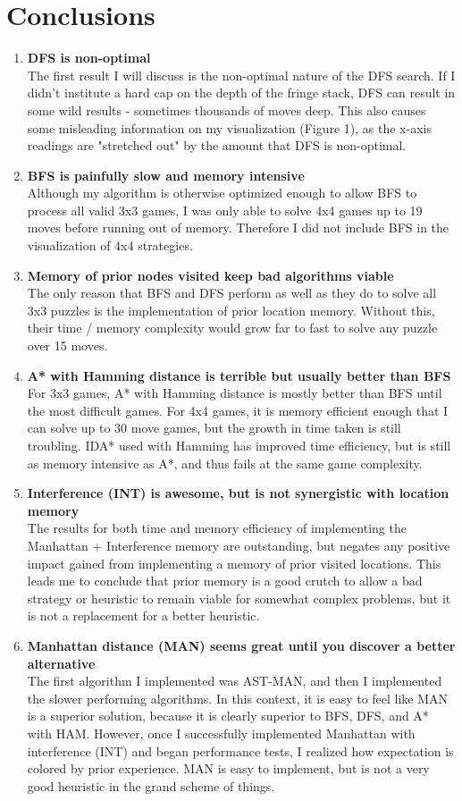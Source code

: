 \documentclass{article}
\newcommand\bitem[1]{\item{\bfseries #1}\\}
\begin{document}
	\section{Conclusions}
	    \begin{enumerate}
	    	\bitem{DFS is non-optimal}
	The first result I will discuss is the non-optimal nature of the DFS search.  If I didn't institute a hard cap on the depth of the fringe stack, DFS can result in some wild results - sometimes thousands of moves deep.  This also causes some misleading information on my visualization (Figure 1), as the x-axis readings are "stretched out" by the amount that DFS is non-optimal.
	        \bitem{BFS is painfully slow and memory intensive}
	Although my algorithm is otherwise optimized enough to allow BFS to process all valid 3x3 games, I was only able to solve 4x4 games up to 19 moves before running out of memory.  Therefore I did not include BFS in the visualization of 4x4 strategies.   
	        \bitem{Memory of prior nodes visited keep bad algorithms viable}
	The only reason that BFS and DFS perform as well as they do to solve all 3x3 puzzles is the implementation of prior location memory.  Without this, their time / memory complexity would grow far to fast to solve any puzzle over 15 moves.
	        \bitem{A* with Hamming distance is terrible but usually better than BFS}
	For 3x3 games, A* with Hamming distance is mostly better than BFS until the most difficult games.  For 4x4 games, it is memory efficient enough that I can solve up to 30 move games, but the growth in time taken is still troubling.  IDA* used with Hamming has improved time efficiency, but is still as memory intensive as A*, and thus fails at the same game complexity.
	        \bitem{Interference (INT) is awesome, but is not synergistic with location memory}
	The results for both time and memory efficiency of implementing the Manhattan + Interference memory are outstanding, but negates any positive impact gained from implementing a memory of prior visited locations.  This leads me to conclude that prior memory is a good crutch to allow a bad strategy or heuristic to remain viable for somewhat complex problems, but it is not a replacement for a better heuristic.
	        \bitem{Manhattan distance (MAN) seems great until you discover a better alternative}
	The first algorithm I implemented was AST-MAN, and then I implemented the slower performing algorithms.  In this context, it is easy to feel like MAN is a superior solution, because it is clearly superior to BFS, DFS, and A* with HAM.  However, once I successfully implemented Manhattan with interference (INT) and began performance tests, I realized how expectation is colored by prior experience.  MAN is easy to implement, but is not a very good heuristic in the grand scheme of things. 

\end{enumerate}
\end{document}
